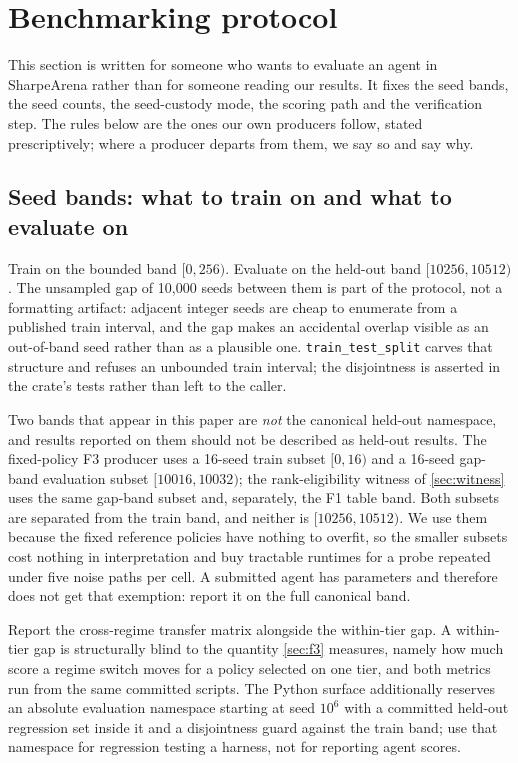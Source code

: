 \section{Benchmarking protocol}\label{sec:protocol}

This section is written for someone who wants to evaluate an agent in SharpeArena rather than for someone reading our results. It fixes the seed bands, the seed counts, the seed-custody mode, the scoring path and the verification step. The rules below are the ones our own producers follow, stated prescriptively; where a producer departs from them, we say so and say why.

\subsection{Seed bands: what to train on and what to evaluate on}\label{sec:protocol-bands}

Train on the bounded band $[0,256)$. Evaluate on the held-out band $[10256,10512)$. The unsampled gap of 10{,}000 seeds between them is part of the protocol, not a formatting artifact: adjacent integer seeds are cheap to enumerate from a published train interval, and the gap makes an accidental overlap visible as an out-of-band seed rather than as a plausible one. \texttt{train\_test\_split} carves that structure and refuses an unbounded train interval; the disjointness is asserted in the crate's tests rather than left to the caller.

Two bands that appear in this paper are \emph{not} the canonical held-out namespace, and results reported on them should not be described as held-out results. The fixed-policy F3 producer uses a 16-seed train subset $[0,16)$ and a 16-seed gap-band evaluation subset $[10016,10032)$; the rank-eligibility witness of \cref{sec:witness} uses the same gap-band subset and, separately, the F1 table band. Both subsets are separated from the train band, and neither is $[10256,10512)$. We use them because the fixed reference policies have nothing to overfit, so the smaller subsets cost nothing in interpretation and buy tractable runtimes for a probe repeated under five noise paths per cell. A submitted agent has parameters and therefore does not get that exemption: report it on the full canonical band.

Report the cross-regime transfer matrix alongside the within-tier gap. A within-tier gap is structurally blind to the quantity \cref{sec:f3} measures, namely how much score a regime switch moves for a policy selected on one tier, and both metrics run from the same committed scripts. The Python surface additionally reserves an absolute evaluation namespace starting at seed $10^6$ with a committed held-out regression set inside it and a disjointness guard against the train band; use that namespace for regression testing a harness, not for reporting agent scores.

